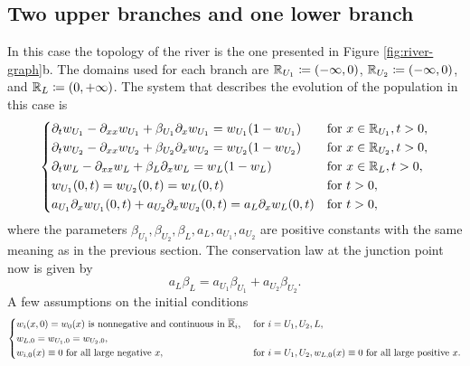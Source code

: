 \subsection{Two upper branches and one lower branch}
In this case the topology of the river is the one presented in Figure \ref{fig:river-graph}b. The domains used for each branch are \(\mathbb{R}_{U_1} \coloneqq (-\infty, 0)\), \(\mathbb{R}_{U_2} \coloneqq (-\infty, 0)\), and \(\mathbb{R}_L \coloneqq (0, +\infty)\). The system that describes the evolution of the population in this case is
\begin{equation}
    \begin{dcases}
        \partial_t w_{U_1} - \partial_{xx}w_{U_1} + \beta_{U_1} \partial_x w_{U_1} = w_{U_1}(1 - w_{U_1}) & \text{for } x \in \mathbb{R}_{U_1}, t > 0, \\
        \partial_t w_{U_2} - \partial_{xx}w_{U_2} + \beta_{U_2} \partial_x w_{U_2} = w_{U_2}(1 - w_{U_2}) & \text{for } x \in \mathbb{R}_{U_2}, t > 0, \\
        \partial_t w_L - \partial_{xx}w_L + \beta_L \partial_x w_L = w_L(1 - w_L) & \text{for } x \in \mathbb{R}_L, t > 0, \\
        w_{U_1}(0, t) = w_{U_2}(0, t) = w_L(0, t) & \text{for } t > 0, \\
        a_{U_1} \partial_x w_{U_1}(0, t) + a_{U_2} \partial_x w_{U_2}(0, t) = a_L \partial_x w_L(0, t) & \text{for } t > 0, \\
    \end{dcases}
    \label{eq:1.11}
\end{equation}
where the parameters \(\beta_{U_1}, \beta_{U_2}, \beta_L, a_L, a_{U_1}, a_{U_2}\) are positive constants with the same meaning as in the previous section. The conservation law at the junction point now is given by
\begin{equation}
    a_L \beta_L = a_{U_1} \beta_{U_1} + a_{U_2} \beta_{U_2}.
    \label{eq:1.12}
\end{equation}
A few assumptions on the initial conditions
\begin{equation}
    \begin{dcases}
        w_i(x, 0) = w_0(x) \text{ is nonnegative and continuous in } \overline{\mathbb{R}}_i, & \text{ for } i = U_1, U_2, L, \\
        w_{L,0} = w_{U_1,0} = w_{U_2,0}, \\
        w_{i,0}(x) \equiv 0 \text{ for all large negative } x, & \text{ for } i = U_1, U_2,
        w_{L,0}(x) \equiv 0 \text{ for all large positive } x.
    \end{dcases}
    \label{eq:1.13}
\end{equation}

